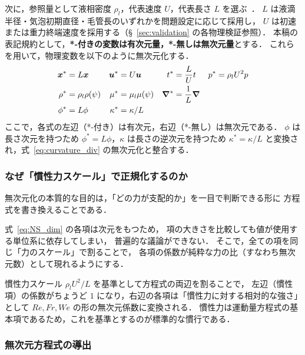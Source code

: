 次に，参照量として液相密度 $\rho_l$，代表速度 $U$，代表長さ $L$ を選ぶ~\cite{Tryggvason2011}．
$L$ は液滴半径・気泡初期直径・毛管長のいずれかを問題設定に応じて採用し，
$U$ は初速または重力終端速度を採用する（§~\ref{sec:validation} の各物理検証参照）．
本稿の表記規約として，\textbf{*-付きの変数は有次元量，*-無しは無次元量}とする．
これらを用いて，物理変数を以下のように無次元化する．
\begin{align}
 \bm{x}^* &= L\bm{x} & \bm{u}^* &= U\bm{u} & t^* &= \frac{L}{U}t & p^* &= \rho_l U^2 p \\
 \rho^* &= \rho_l \rho(\psi) & \mu^* &= \mu_l \mu(\psi) & \bm{\nabla}^* &= \frac{1}{L}\bm{\nabla} \\
 \phi^* &= L\phi & \kappa^* &= \kappa/L
\end{align}
ここで，各式の左辺（*-付き）は有次元，右辺（*-無し）は無次元である．
$\phi$ は長さ次元を持つため $\phi^* = L\phi$，$\kappa$ は長さの逆次元を持つため
$\kappa^* = \kappa/L$ と変換され，式~\eqref{eq:curvature_div} の無次元化と整合する．

\subsubsection{なぜ「慣性力スケール」で正規化するのか}

無次元化の本質的な目的は，「どの力が支配的か」を一目で判断できる形に
方程式を書き換えることである．

式~\eqref{eq:NS_dim} の各項は次元をもつため，
項の大きさを比較しても値が使用する単位系に依存してしまい，
普遍的な議論ができない．
そこで，全ての項を同じ「力のスケール」で割ることで，
各項の係数が純粋な力の比（すなわち無次元数）として現れるようにする．

慣性力スケール $\rho_l U^2/L$ を基準として方程式の両辺を割ることで，
左辺（慣性項）の係数がちょうど $1$ になり，右辺の各項は「慣性力に対する相対的な強さ」として
$Re, Fr, We$ の形の無次元係数に変換される．
慣性力は運動量方程式の基本項であるため，これを基準とするのが標準的な慣行である．

\subsubsection{無次元方程式の導出}

